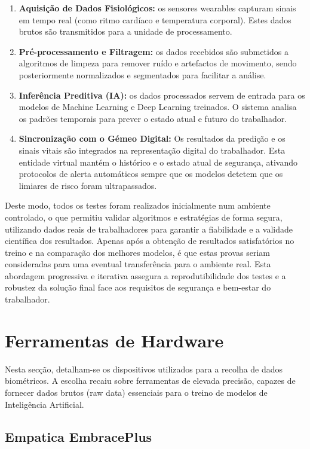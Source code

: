 \begin{enumerate}
\item \textbf{Aquisição de Dados Fisiológicos:} os sensores wearables capturam sinais em tempo real (como ritmo cardíaco e temperatura corporal). Estes dados brutos são transmitidos para a unidade de processamento.
\item \textbf{Pré-processamento e Filtragem:} os dados recebidos são submetidos a algoritmos de limpeza para remover ruído e artefactos de movimento, sendo posteriormente normalizados e segmentados para facilitar a análise.
\item \textbf{Inferência Preditiva (IA):} os dados processados servem de entrada para os modelos de Machine Learning e Deep Learning treinados. O sistema analisa os padrões temporais para prever o estado atual e futuro do trabalhador.
\item \textbf{Sincronização com o Gémeo Digital:} Os resultados da predição e os sinais vitais são integrados na representação digital do trabalhador. Esta entidade virtual mantém o histórico e o estado atual de segurança, ativando protocolos de alerta automáticos sempre que os modelos detetem que os limiares de risco foram ultrapassados.
\end{enumerate}

Deste modo, todos os testes foram realizados inicialmente num ambiente controlado, o que permitiu validar algoritmos e estratégias de forma segura, utilizando dados reais de trabalhadores para garantir a fiabilidade e a validade científica dos resultados. Apenas após a obtenção de resultados satisfatórios no treino e na comparação dos melhores modelos, é que estas provas seriam consideradas para uma eventual transferência para o ambiente real. Esta abordagem progressiva e iterativa assegura a reprodutibilidade dos testes e a robustez da solução final face aos requisitos de segurança e bem-estar do trabalhador.

\section{Ferramentas de Hardware}
\label{sec:hardware}

Nesta secção, detalham-se os dispositivos utilizados para a recolha de dados biométricos. A escolha recaiu sobre ferramentas de elevada precisão, capazes de fornecer dados brutos (raw data) essenciais para o treino de modelos de Inteligência Artificial.

\subsection{Empatica EmbracePlus}

